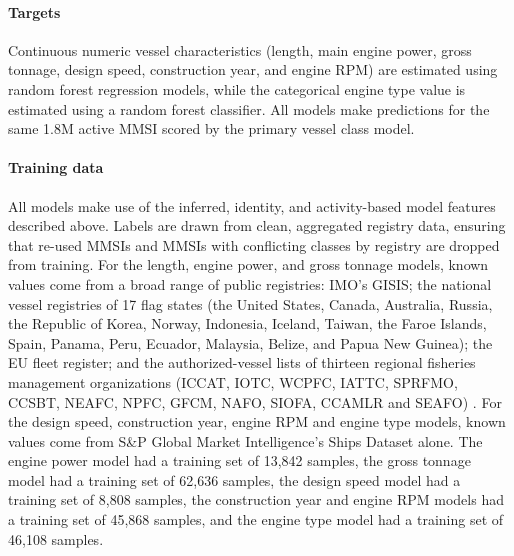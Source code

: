 \documentclass[lineno,pdflatex,sn-nature]{sn-jnl}
\begin{document}
\paragraph{Targets}

Continuous numeric vessel characteristics (length, main engine power, gross tonnage, design speed, construction year, and engine RPM) are estimated using random forest regression models, while the categorical engine type value is estimated using a random forest classifier. All models make predictions for the same 1.8M active MMSI scored by the primary vessel class model.

\paragraph{Training data}

All models make use of the inferred, identity, and activity-based model features described above. Labels are drawn from clean, aggregated registry data, ensuring that re-used MMSIs and MMSIs with conflicting classes by registry are dropped from training. For the length, engine power, and gross tonnage models, known values come from a broad range of public registries: IMO's GISIS; the national vessel registries of 17 flag states (the United States, Canada, Australia, Russia, the Republic of Korea, Norway, Indonesia, Iceland, Taiwan, the Faroe Islands, Spain, Panama, Peru, Ecuador, Malaysia, Belize, and Papua New Guinea); the EU fleet register; and the authorized-vessel lists of thirteen regional fisheries management organizations (ICCAT, IOTC, WCPFC, IATTC, SPRFMO, CCSBT, NEAFC, NPFC, GFCM, NAFO, SIOFA, CCAMLR and SEAFO) \cite{park2023tracking}.  For the design speed, construction year, engine RPM and engine type models, known values come from S\&P Global Market Intelligence's Ships Dataset alone.
The engine power model had a training set of 13,842 samples, the gross tonnage model had a training set of 62,636 samples, the design speed model had a training set of 8,808 samples, the construction year and engine RPM models had a training set of 45,868 samples, and the engine type model had a training set of 46,108 samples.
\end{document}
